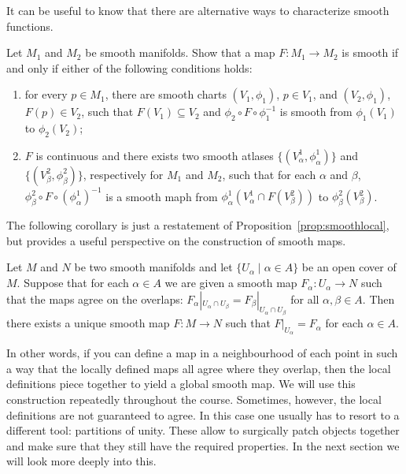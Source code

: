 It can be useful to know that there are alternative ways to characterize smooth functions.
\begin{exercise}\label{prop:eq-def-smooth}
  Let $M_1$ and $M_2$ be smooth manifolds.
  Show that a map $F:M_1\to M_2$ is smooth if and only if either of the following conditions holds:
  \begin{enumerate}
    \item for every $p\in M_1$, there are smooth charts $(V_1,\phi_1)$, $p\in V_1$, and $(V_2,\phi_1)$, $F(p) \in V_2$, such that $F(V_1) \subseteq V_2$ and $\phi_2 \circ F \circ \phi_1^{-1}$ is smooth from $\phi_1(V_1)$ to $\phi_2(V_2)$;
    \item $F$ is continuous and there exists two smooth atlases $\{(V^1_\alpha, \phi^1_\alpha)\}$ and $\{(V^2_\beta, \phi^2_\beta)\}$, respectively for $M_1$ and $M_2$, such that for each $\alpha$ and $\beta$, $\phi^2_\beta \circ F \circ (\phi^1_\alpha)^{-1}$ is a smooth maph from $\phi^1_\alpha(V^1_\alpha \cap F(V_\beta^2))$ to $\phi^2_\beta(V^2_\beta)$.
  \end{enumerate}
\end{exercise}


The following corollary is just a restatement of Proposition~\ref{prop:smoothlocal}, but provides a useful perspective on the construction of smooth maps.

\begin{proposition}
  Let $M$ and $N$ be two smooth manifolds and let $\{U_\alpha\mid\alpha\in A\}$ be an open cover of $M$.
  Suppose that for each $\alpha\in A$ we are given a smooth map $F_
    \alpha:U_\alpha\to N$ such that the maps agree on the overlaps: $F_\alpha|_{U_\alpha\cap U_\beta} = F_\beta|_{U_\alpha\cap U_\beta}$ for all $\alpha,\beta\in A$.
  Then there exists a unique smooth map $F:M\to N$ such that $F|_{U_\alpha} = F_\alpha$ for each $\alpha\in A$.
\end{proposition}

In other words, if you can define a map in a neighbourhood of each point in such a way that the locally defined maps all agree where they overlap, then the local definitions piece together to yield a global smooth map.
We will use this construction repeatedly throughout the course.
Sometimes, however, the local definitions are not guaranteed to agree. In this case one usually has to resort to a different tool: partitions of unity.
These allow to surgically patch objects together and make sure that they still have the required properties.
In the next section we will look more deeply into this.

